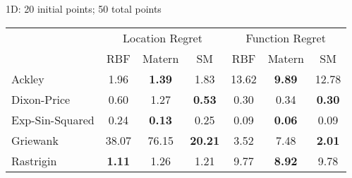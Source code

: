 \documentclass{article}
\begin{document}
1D: 20 initial points; 50 total points
\begin{center}
\begin{tabular}{ | l | c | c | c | c | c | c |}
\hline
& \multicolumn{3}{|c|}{Location Regret} & \multicolumn{3}{|c|}{Function Regret} \\
\cline{2-7}
& RBF & Matern & SM & RBF & Matern & SM \\
\hline
Ackley & 1.96 & \textbf{1.39} & 1.83 & 13.62 & \textbf{9.89} & 12.78 \\
\hline
Dixon-Price & 0.60 & 1.27 & \textbf{0.53} & 0.30 & 0.34 & \textbf{0.30} \\
\hline
Exp-Sin-Squared & 0.24 & \textbf{0.13} & 0.25 & 0.09 & \textbf{0.06} & 0.09 \\
\hline
Griewank & 38.07 & 76.15 & \textbf{20.21} & 3.52 & 7.48 & \textbf{2.01} \\
\hline
Rastrigin & \textbf{1.11} & 1.26 & 1.21 & 9.77 & \textbf{8.92} & 9.78 \\
\hline
\end{tabular}
\end{center}
\end{document}
